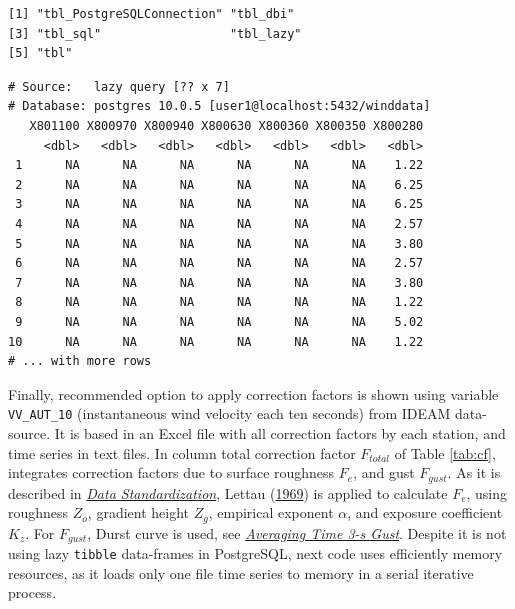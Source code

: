 \documentclass[12pt,twoside]{reedthesis}
\newenvironment{Shaded}{\begin{snugshade}}{\end{snugshade}}
\newcommand{\DecValTok}[1]{\textcolor[rgb]{0.00,0.00,0.81}{#1}}
\newcommand{\KeywordTok}[1]{\textcolor[rgb]{0.13,0.29,0.53}{\textbf{#1}}}
\newcommand{\NormalTok}[1]{#1}
\newcommand{\OperatorTok}[1]{\textcolor[rgb]{0.81,0.36,0.00}{\textbf{#1}}}
\newcommand{\StringTok}[1]{\textcolor[rgb]{0.31,0.60,0.02}{#1}}
\begin{document}
\begin{verbatim}
[1] "tbl_PostgreSQLConnection" "tbl_dbi"                 
[3] "tbl_sql"                  "tbl_lazy"                
[5] "tbl"                     
\end{verbatim}
\vspace{0.4cm}
\begin{Shaded}
\end{Shaded}
\begin{verbatim}
# Source:   lazy query [?? x 7]
# Database: postgres 10.0.5 [user1@localhost:5432/winddata]
   X801100 X800970 X800940 X800630 X800360 X800350 X800280
     <dbl>   <dbl>   <dbl>   <dbl>   <dbl>   <dbl>   <dbl>
 1      NA      NA      NA      NA      NA      NA    1.22
 2      NA      NA      NA      NA      NA      NA    6.25
 3      NA      NA      NA      NA      NA      NA    6.25
 4      NA      NA      NA      NA      NA      NA    2.57
 5      NA      NA      NA      NA      NA      NA    3.80
 6      NA      NA      NA      NA      NA      NA    2.57
 7      NA      NA      NA      NA      NA      NA    3.80
 8      NA      NA      NA      NA      NA      NA    1.22
 9      NA      NA      NA      NA      NA      NA    5.02
10      NA      NA      NA      NA      NA      NA    1.22
# ... with more rows
\end{verbatim}
\normalsize

Finally, recommended option to apply correction factors is shown using variable \texttt{VV\_AUT\_10} (instantaneous wind velocity each ten seconds) from IDEAM data-source. It is based in an Excel file with all correction factors by each station, and time series in text files. In column total correction factor \(F_{total}\) of Table \ref{tab:cf}, integrates correction factors due to surface roughness \(F_{e}\), and gust \(F_{gust}\). As it is described in \emph{\protect\hyperlink{rmd-standardization}{Data Standardization}}, Lettau (\protect\hyperlink{ref-Lettau1969}{1969}) is applied to calculate \(F_e\), using roughness \(Z_o\), gradient height \(Z_g\), empirical exponent \(\alpha\), and exposure coefficient \(K_z\). For \(F_{gust}\), Durst curve is used, see \emph{\protect\hyperlink{rmd-gust}{Averaging Time 3-s Gust}}. Despite it is not using lazy \texttt{tibble} data-frames in PostgreSQL, next code uses efficiently memory resources, as it loads only one file time series to memory in a serial iterative process.
\end{document}
